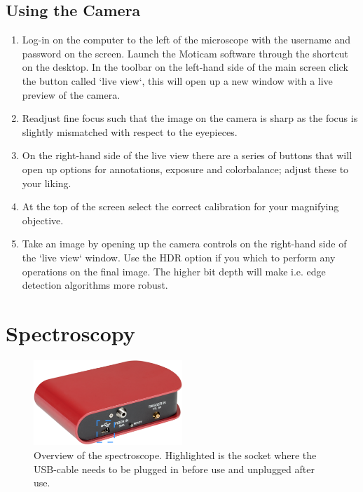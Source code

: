 \documentclass[a4paper]{scrartcl}
\begin{document}
\subsection*{Using the Camera}
\begin{enumerate}
	\item Log-in on the computer to the left of the microscope with the username and password on the screen. Launch the Moticam software through the shortcut on the desktop. In the toolbar on the left-hand side of the main screen click the button called `live view`, this will open up a new window with a live preview of the camera.
	\item Readjust fine focus such that the image on the camera is sharp as the focus is slightly mismatched with respect to the eyepieces.
	\item On the right-hand side of the live view there are a series of buttons that will open up options for annotations, exposure and colorbalance; adjust these to your liking.
	\item At the top of the screen select the correct calibration for your magnifying objective.
	\item Take an image by opening up the camera controls on the right-hand side of the `live view` window. Use the HDR option if you which to perform any operations on the final image. The higher bit depth will make i.e. edge detection algorithms more robust.
\end{enumerate}

\section*{Spectroscopy}
\begin{figure}[h]
	\begin{center}
		\includegraphics[width=0.5\textwidth, keepaspectratio]{figures/spectroscope.png}
	\end{center}
	\caption{Overview of the spectroscope. Highlighted is the socket where the USB-cable needs to be plugged in before use and unplugged after use.}
	\label{fig:spectroscope}
\end{figure}
\end{document}
